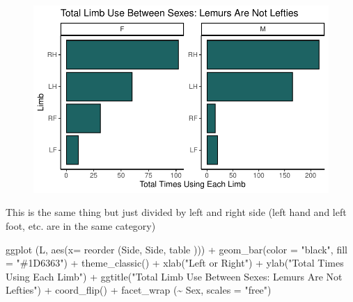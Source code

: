 \documentclass[
  letterpaper,
  DIV=11,
  numbers=noendperiod]{scrartcl}
\newenvironment{Shaded}{\begin{snugshade}}{\end{snugshade}}
\newcommand{\AttributeTok}[1]{\textcolor[rgb]{0.40,0.45,0.13}{#1}}
\newcommand{\FunctionTok}[1]{\textcolor[rgb]{0.28,0.35,0.67}{#1}}
\newcommand{\NormalTok}[1]{\textcolor[rgb]{0.00,0.23,0.31}{#1}}
\newcommand{\SpecialCharTok}[1]{\textcolor[rgb]{0.37,0.37,0.37}{#1}}
\newcommand{\StringTok}[1]{\textcolor[rgb]{0.13,0.47,0.30}{#1}}
\begin{document}
\begin{figure}[H]

{\centering \includegraphics{LeftyLemurs_files/figure-pdf/unnamed-chunk-20-1.pdf}

}

\end{figure}

This is the same thing but just divided by left and right side (left
hand and left foot, etc. are in the same category)

\begin{Shaded}
\begin{Highlighting}[]
\FunctionTok{ggplot}\NormalTok{ (L, }\FunctionTok{aes}\NormalTok{(}\AttributeTok{x=} \FunctionTok{reorder}\NormalTok{ (Side, Side, table ))) }\SpecialCharTok{+}
  \FunctionTok{geom\_bar}\NormalTok{(}\AttributeTok{color =} \StringTok{"black"}\NormalTok{, }\AttributeTok{fill =} \StringTok{"\#1D6363"}\NormalTok{) }\SpecialCharTok{+}
  \FunctionTok{theme\_classic}\NormalTok{() }\SpecialCharTok{+}
  \FunctionTok{xlab}\NormalTok{(}\StringTok{"Left or Right"}\NormalTok{) }\SpecialCharTok{+}
  \FunctionTok{ylab}\NormalTok{(}\StringTok{"Total Times Using Each Limb"}\NormalTok{) }\SpecialCharTok{+}
  \FunctionTok{ggtitle}\NormalTok{(}\StringTok{"Total Limb Use Between Sexes: Lemurs Are Not Lefties"}\NormalTok{) }\SpecialCharTok{+}
  \FunctionTok{coord\_flip}\NormalTok{() }\SpecialCharTok{+}
  \FunctionTok{facet\_wrap}\NormalTok{ (}\SpecialCharTok{\textasciitilde{}}\NormalTok{ Sex, }\AttributeTok{scales =} \StringTok{"free"}\NormalTok{)}
\end{Highlighting}
\end{Shaded}
\end{document}
